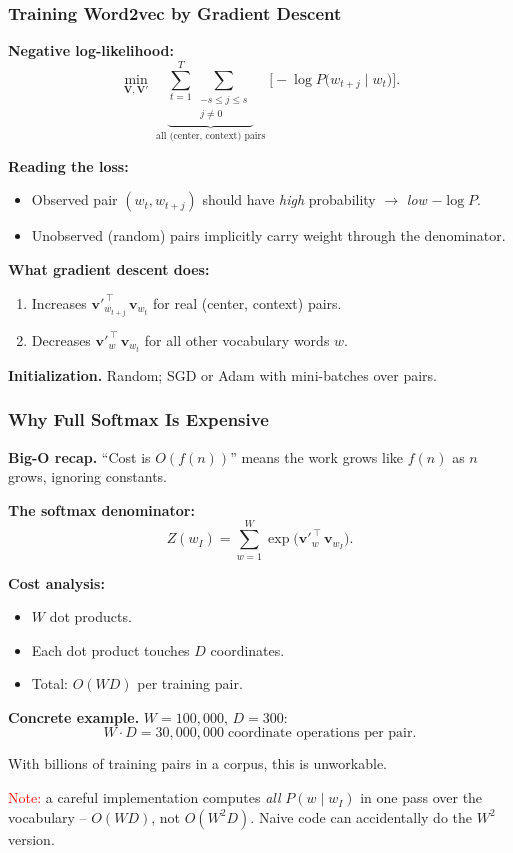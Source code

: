 \documentclass[notes,11pt, aspectratio=169]{beamer}
\newcommand{\vv}{\mathbf{v}}
\newcommand{\vV}{\mathbf{V}}
\begin{document}
\begin{frame}
\frametitle{Training Word2vec by Gradient Descent}

\textbf{Negative log-likelihood:}
\[
    \min_{\vV, \vV'} \;
    \underbrace{\sum_{t=1}^T \sum_{\substack{-s \leq j \leq s \\ j \neq 0}}}_{\text{all (center, context) pairs}}
    \;\bigl[ -\log P\bigl(w_{t+j} \mid w_t\bigr) \bigr].
\]

\vspace{6pt}
\textbf{Reading the loss:}
\begin{itemize}
    \item Observed pair $(w_t, w_{t+j})$ should have \emph{high} probability $\to$ \emph{low} $-\log P$.
    \item Unobserved (random) pairs implicitly carry weight through the denominator.
\end{itemize}

\vspace{8pt}
\textbf{What gradient descent does:}
\begin{enumerate}
    \item Increases $\vv'^{\,\top}_{w_{t+j}}\, \vv_{w_t}$ for real (center, context) pairs.
    \item Decreases $\vv'^{\,\top}_{w}\, \vv_{w_t}$ for all other vocabulary words $w$.
\end{enumerate}

\vspace{4pt}
\textbf{Initialization.} Random; SGD or Adam with mini-batches over pairs.
\end{frame}

\begin{frame}
\frametitle{Why Full Softmax Is Expensive}

\textbf{Big-O recap.} ``Cost is $O(f(n))$'' means the work grows like $f(n)$ as $n$ grows, ignoring constants.

\vspace{6pt}
\textbf{The softmax denominator:}
\[
    Z(w_I) = \sum_{w=1}^W \exp\!\bigl(\vv'^{\,\top}_w\, \vv_{w_I}\bigr).
\]

\vspace{4pt}
\textbf{Cost analysis:}
\begin{itemize}
    \item $W$ dot products.
    \item Each dot product touches $D$ coordinates.
    \item Total: $O(W D)$ per training pair.
\end{itemize}

\vspace{6pt}
\textbf{Concrete example.} $W = 100{,}000$, $D = 300$:
\[
    W \cdot D = 30{,}000{,}000 \;\text{coordinate operations per pair}.
\]

With billions of training pairs in a corpus, this is unworkable.

\vspace{6pt}
\textcolor{red}{Note:} a careful implementation computes \emph{all} $P(w \mid w_I)$ in one pass over the vocabulary -- $O(WD)$, not $O(W^2 D)$. Naive code can accidentally do the $W^2$ version.
\end{frame}
\end{document}
